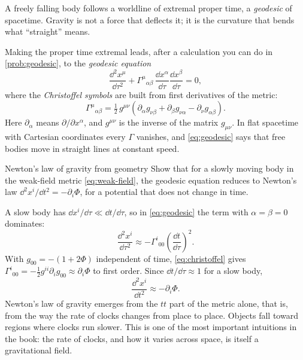 \begin{keyidea}
A freely falling body follows a worldline of extremal proper time, a
\emph{geodesic} of spacetime. Gravity is not a force that deflects it; it is
the curvature that bends what \enquote{straight} means.
\end{keyidea}

Making the proper time extremal leads, after a calculation you can do in
\cref{prob:geodesic}, to the \emph{geodesic equation}
\begin{equation}
  \frac{\dd^{2}x^{\mu}}{\dd\tau^{2}}
  + \Gamma^{\mu}{}_{\alpha\beta}\,\frac{\dd x^{\alpha}}{\dd\tau}\frac{\dd x^{\beta}}{\dd\tau} = 0,
  \label{eq:geodesic}
\end{equation}
where the \emph{Christoffel symbols} are built from first derivatives of the
metric:
\begin{equation}
  \Gamma^{\mu}{}_{\alpha\beta} = \tfrac{1}{2}\,g^{\mu\nu}
  \left(\partial_{\alpha}g_{\nu\beta} + \partial_{\beta}g_{\nu\alpha} - \partial_{\nu}g_{\alpha\beta}\right).
  \label{eq:christoffel}
\end{equation}
Here $\partial_{\alpha}$ means $\partial/\partial x^{\alpha}$, and $g^{\mu\nu}$ is
the inverse of the matrix $g_{\mu\nu}$. In flat spacetime with Cartesian
coordinates every $\Gamma$ vanishes, and \cref{eq:geodesic} says that free
bodies move in straight lines at constant speed.

\begin{example}{Newton's law of gravity from geometry}\label{ex:newton}
Show that for a slowly moving body in the weak-field metric
\cref{eq:weak-field}, the geodesic equation reduces to Newton's law
$\dd^{2}x^{i}/\dd t^{2} = -\partial_{i}\Phi$, for a potential that does not
change in time.

\solution A slow body has $\dd x^{i}/\dd\tau \ll \dd t/\dd\tau$, so in
\cref{eq:geodesic} the term with $\alpha = \beta = 0$ dominates:
\begin{equation*}
  \frac{\dd^{2}x^{i}}{\dd\tau^{2}} \approx -\Gamma^{i}{}_{00}\left(\frac{\dd t}{\dd\tau}\right)^{2}.
\end{equation*}
With $g_{00} = -(1+2\Phi)$ independent of time, \cref{eq:christoffel} gives
$\Gamma^{i}{}_{00} = -\tfrac{1}{2}g^{ii}\partial_{i}g_{00} \approx \partial_{i}\Phi$ to
first order. Since $\dd t/\dd\tau \approx 1$ for a slow body,
\begin{equation*}
  \frac{\dd^{2}x^{i}}{\dd t^{2}} \approx -\partial_{i}\Phi .
\end{equation*}
\discussion Newton's law of gravity emerges from the $tt$ part of the metric
alone, that is, from the way the rate of clocks changes from place to place.
Objects fall toward regions where clocks run slower. This is one of the most
important intuitions in the book: the rate of clocks, and how it varies across
space, is itself a gravitational field.
\end{example}

